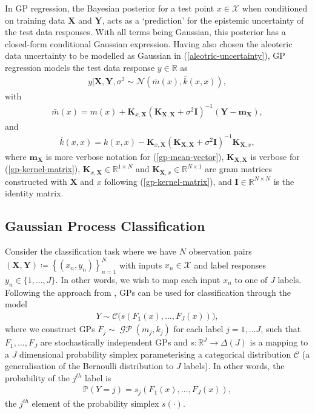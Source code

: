 \documentclass{article}
\newcommand{\GP}{\operatorname{\mathcal{GP}}}
\numberwithin{equation}{section}
\begin{document}
In GP regression, the Bayesian posterior for a test point $x \in \mathcal{X}$ when conditioned on training data $\mathbf{X}$ and $\mathbf{Y}$, acts as a `prediction' for the epistemic uncertainty of the test data responses. With all terms being Gaussian, this posterior has a closed-form conditional Gaussian expression.
Having also chosen the aleoteric data uncertainty to be modelled as Gaussian in (\ref{aleotric-uncertainty}), GP regression models the test data response $y \in \mathbb{R}$ as
\begin{align}
    y \vert \mathbf{X}, \mathbf{Y}, \sigma^2
    \sim \mathcal{N}\left(\bar{m}(x), \bar{k}(x, x)\right),
    \label{gp-posterior-normal}
\end{align}
with
\begin{align}
    \label{gp-posterior-mean}
    \bar{m}(x) = m(x) + \mathbf{K}_{x, \mathbf{X}} \left(\mathbf{K}_{\mathbf{X}, \mathbf{X}} + \sigma^2 \mathbf{I}\right)^{-1} \left( \mathbf{Y} - \mathbf{m}_{\mathbf{X}}\right),
\end{align}
and
\begin{align}
    \label{gp-posterior-covariance}
    \bar{k}(x, x) = k(x, x) - \mathbf{K}_{x, \mathbf{X}} \left(\mathbf{K}_{\mathbf{X}, \mathbf{X}} + \sigma^2 \mathbf{I}\right)^{-1} \mathbf{K}_{\mathbf{X}, x},
\end{align}
where $\mathbf{m}_{\mathbf{X}}$ is more verbose notation for (\ref{gp-mean-vector}), $\mathbf{K}_{\mathbf{X}, \mathbf{X}}$ is verbose for (\ref{gp-kernel-matrix}), $\mathbf{K}_{x, \mathbf{X}} \in \mathbb{R}^{1 \times N}$ and $\mathbf{K}_{\mathbf{X}, x} \in \mathbb{R}^{N \times 1}$ are gram matrices constructed with $\mathbf{X}$ and $x$ following (\ref{gp-kernel-matrix}), and $\mathbf{I} \in \mathbb{R}^{N \times N}$ is the identity matrix.

\subsection{Gaussian Process Classification}
Consider the classification task where we have $N$ observation pairs $(\mathbf{X}, \mathbf{Y}) \coloneqq \left\{(x_n, y_n)\right\}_{n=1}^{N}$ with inputs $x_n \in \mathcal{X}$ and label responses $y_n \in \{1, \dots, J\}$. In other words, we wish to map each input $x_n$ to one of $J$ labels. Following the approach from \cite{matthews2017scalable}, GPs can be used for classification through the model
\begin{align}
    Y \sim \mathcal{C}\Big(s\left(F_1(x), \dots, F_J(x)\right)\Big),
    \label{gp-classifier}
\end{align}
where we construct GPs $F_j \sim \GP\left(m_j, k_j\right)$ for each label $j=1, \dots J$, such that $F_1, \dots, F_J$ are stochastically independent GPs and $s: \mathbb{R}^J \rightarrow \Delta(J)$ is a mapping to a $J$ dimensional probability simplex parameterising a categorical distribution $\mathcal{C}$ (a generalisation of the Bernoulli distribution to $J$ labels). In other words, the probability of the $j^{th}$ label is
\begin{align}
    \mathbb{P}(Y=j) = s_j(F_1(x), \dots, F_J(x)),
\end{align}
the $j^{th}$ element of the probability simplex $s(\cdot)$.
\end{document}
